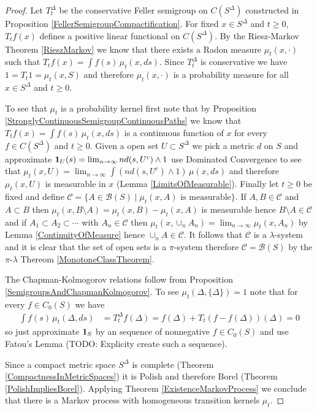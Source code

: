 \begin{proof}
Let $T^\Delta_t$ be the conservative Feller semigroup on $C(S^\Delta)$ constructed in Proposition \ref{FellerSemigroupCompactification}.  For fixed $x \in S^\Delta$ and $t \geq 0$, $T_t f(x)$ defines a positive linear functional on $C(S^\Delta)$.  By the Riesz-Markov Theorem \ref{RieszMarkov} we know that there exists a Radon measure $\mu_t(x, \cdot)$ such that $T_t f(x) = \int f(s) \, \mu_t(x, ds)$.  Since $T^\Delta_t$ is conservative we have $1 = T_t 1 = \mu_t(x, S)$ and therefore $\mu_t(x, \cdot)$ is a probability measure for all $x \in S^\Delta$ and $t \geq 0$.

To see that $\mu_t$ is a probability kernel first note that by Proposition \ref{StronglyContinuousSemigroupContinuousPaths} we know that $T_t f(x) = \int f(s) \, \mu_t(x, ds)$ is a continuous function of $x$ for every $f \in C(S^\Delta)$ and $t \geq 0$.  Given a open set $U \subset S^\Delta$ we pick a metric $d$ on $S$ and approximate $\textbf{1}_{U}(s) = \lim_{n \to \infty} n d(s, U^c) \wedge 1$ use Dominated Convergence to see that $\mu_t(x, U) = \lim_{n \to \infty} \int (n d(s, U^c) \wedge 1) \, \mu(x, ds)$ and therefore $\mu_t(x, U)$ is measurable in $x$ (Lemma \ref{LimitsOfMeasurable}).  Finally let $t \geq 0$ be fixed and define $\mathcal{C} = \lbrace A \in \mathcal{B}(S) \mid \mu_t(x, A) \text{ is measurable}\rbrace$.  If $A, B \in \mathcal{C}$ and $A \subset B$ then $\mu_t(x, B \setminus A) = \mu_t(x, B) - \mu_t(x, A)$ is measurable hence $B \setminus A \in \mathcal{C}$ and if $A_1 \subset A_2 \subset \cdots$ with $A_n \in \mathcal{C}$ then $\mu_t(x, \cup_n A_n) = \lim_{n \to \infty} \mu_t(x, A_n)$ by Lemma \ref{ContinuityOfMeasure} hence $\cup_n A \in \mathcal{C}$.  It follows that $\mathcal{C}$ is a $\lambda$-system and it is clear that the set of open sets is a $\pi$-system therefore $\mathcal{C} = \mathcal{B}(S)$ by the $\pi$-$\lambda$ Thereom \ref{MonotoneClassTheorem}.

The Chapman-Kolmogorov relations follow from Proposition \ref{SemigroupsAndChapmanKolmogorov}.  To see $\mu_t(\Delta, \lbrace \Delta \rbrace) =1$ note that for every $f \in C_0(S)$ we have
\begin{align*}
\int f(s) \, \mu_t(\Delta, ds) &= T^\Delta_t f(\Delta) = f(\Delta) + T_t (f - f(\Delta))(\Delta) = 0
\end{align*}
so just approximate $\textbf{1}_{S}$ by an sequence of nonnegative $f \in C_0(S)$ and use Fatou's Lemma (TODO: Explicity create such a sequence).

Since a compact metric space $S^\Delta$ is complete (Theorem \ref{CompactnessInMetricSpaces}) it is Polish and therefore Borel (Theorem \ref{PolishImpliesBorel}).  Applying Theorem \ref{ExistenceMarkovProcess} we conclude that there is a Markov process with homogeneous transition kernels $\mu_t$.
\end{proof}

